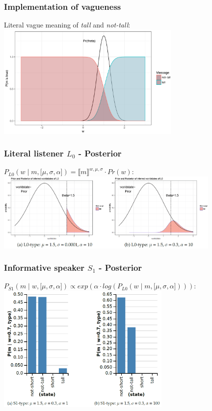 \documentclass[8pt]{beamer}
\begin{document}
\begin{frame}
\frametitle{Implementation of vagueness}
Literal vague meaning of \textit{tall} and \textit{not-tall}:
\vskip5mm
\includegraphics[width=9cm]{bilder/lit_tall_vague.pdf}
\end{frame}

\begin{frame}
\frametitle{Literal listener $L_0$ - Posterior}
$P_{L0}(w \mid m , \big[ \mu, \sigma, \alpha\big]) = \llbracket m \rrbracket^{w,\mu,\sigma} \cdot Pr(w) $:
\vskip5mm
\includegraphics[width=11cm]{bilder/L0-posterior.png}
\end{frame}

\begin{frame}
\frametitle{Informative speaker $S_1$ - Posterior}
\vskip5mm
$P_{S1}(m \mid w, \big[ \mu, \sigma, \alpha\big]) \propto exp(\alpha \cdot log(P_{L0}(w \mid m, \big[ \mu, \sigma, \alpha\big])))$:
\vskip5mm
\includegraphics[width=8.5cm]{bilder/S1-posterior.png}
\end{frame}
\end{document}
